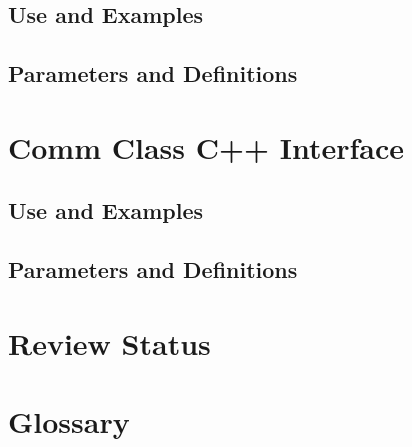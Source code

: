 \documentclass[]{article}
\begin{document}
\subsection{Use and Examples}

%


\subsection{Parameters and Definitions}

%



%


\section{Comm Class C++ Interface}

\subsection{Use and Examples}




\subsection{Parameters and Definitions}

%








\section{Review Status}




\section{Glossary}




 

\end{document}
